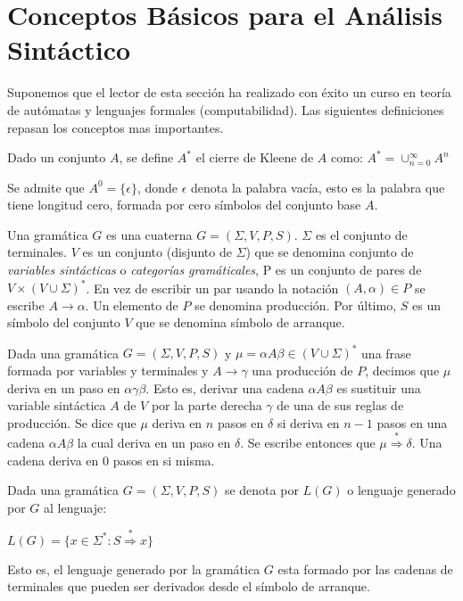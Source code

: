 
\section{Conceptos Básicos para el Análisis Sintáctico}
\label{section:conceptos}
Suponemos que el lector de esta sección ha realizado con éxito
un curso en teoría de autómatas y lenguajes formales (computabilidad).
Las siguientes definiciones repasan los conceptos mas importantes.

\begin{definition}
Dado un conjunto $A$, se define $A^*$ el cierre de Kleene de $A$ como:
\begin{math}
A^* = \cup_{n=0}^{\infty} A^n
\end{math}

Se admite que $A^0 = \{ \epsilon \}$, donde $\epsilon$ denota la palabra vacía, esto es
la palabra que tiene longitud cero, formada por cero símbolos del conjunto base $A$.
\end{definition}

\begin{definition}
Una gramática $G$ es una cuaterna $G =(\Sigma,V,P,S)$. 
$\Sigma$ es el conjunto de terminales. $V$ es un conjunto (disjunto de $\Sigma$)
que se denomina conjunto de \emph{variables sintácticas} o \emph{categorías gramáticales},
P es un conjunto de pares de $V \times (V \cup \Sigma )^*$. En vez de escribir
un par usando la notación $(A, \alpha) \in P$ se escribe $A \rightarrow \alpha$.
Un elemento de $P$ se denomina producción. Por último, $S$ es un símbolo del conjunto
$V$ que se denomina símbolo de arranque.
\end{definition}

\begin{definition}
Dada una gramática $G=(\Sigma,V,P,S)$ y $\mu = \alpha A \beta \in (V \cup \Sigma)^*$
una frase formada por variables y terminales y $A \rightarrow \gamma$ una producción de 
$P$, decimos que  $\mu$ deriva en un paso en  $\alpha \gamma \beta$. Esto es, derivar 
una cadena $\alpha A \beta$ es sustituir 
una variable sintáctica $A$ de $V$ por la parte derecha $\gamma$ de una de sus reglas de producción.
Se dice que $\mu$ deriva en $n$ pasos en $\delta$ si deriva en $n-1$ pasos en una cadena
$\alpha A \beta$ la cual deriva en un paso en $\delta$. Se escribe entonces
que $\mu  \stackrel{*}{\Longrightarrow}  \delta$. Una cadena deriva en 0 pasos en si misma.

\end{definition}

\begin{definition}
\label{definition:lenguajegenerado}
Dada una gramática $G=(\Sigma,V,P,S)$ se denota por $L(G)$ o lenguaje
generado por $G$ al lenguaje:

\begin{center}
$L(G) = \{ x \in \Sigma^* : S \stackrel{*}{\Longrightarrow} x \}$
\end{center}

Esto es, el lenguaje generado por la gramática $G$ esta formado por las cadenas
de terminales que pueden ser derivados desde el símbolo de arranque.
\end{definition}

